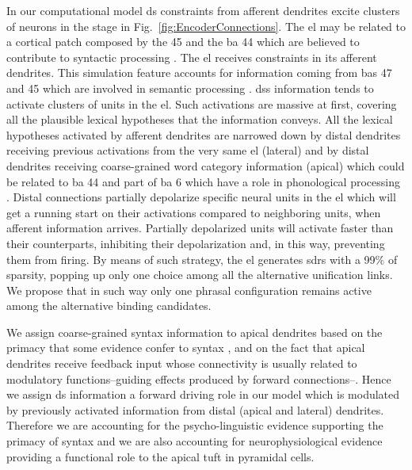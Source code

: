 {In our computational model \gls{ds} constraints from afferent dendrites excite clusters of neurons in the  stage in Fig.~\ref{fig:EncoderConnections}.
The \gls{el} may be related to a cortical patch composed by the  45 and the \gls{ba} 44 which are believed to contribute to syntactic processing \cite{Pallier2522, doi:10.1152/physrev.00006.2011, doi:10.1146/annurev-neuro-071013-013847}. The \gls{el} receives  constraints in its afferent dendrites. This simulation feature accounts for information coming from \glspl{ba} 47 and 45 which are involved in semantic processing \cite{GOUCHA2015294, DECARLI2007933, PMID:15528098, NEWMAN201051}. \glspl{ds} information tends to activate clusters of units in the \gls{el}. Such activations are massive at first, covering all the plausible lexical hypotheses that the  information conveys. All the lexical hypotheses activated by afferent dendrites are narrowed down by distal dendrites receiving previous activations from the very same \gls{el} (lateral) and by distal dendrites receiving coarse-grained word category information (apical)
which could be related to \gls{ba} 44 and part of \gls{ba} 6 which have a role in phonological processing \cite{Lee3942, PMID:27381836, HEIM2003285, PMID:18296070, AMUNTS200442}.
Distal connections partially depolarize specific neural units in the \gls{el} which will get a running start on their activations compared to neighboring units, when afferent information arrives. Partially depolarized units will activate faster than their counterparts, inhibiting their depolarization and, in this way, preventing them from firing. By means of such strategy, the \gls{el} generates \glspl{sdr} with a 99\% of sparsity, popping up only one choice among all the alternative unification links. We propose that in such way only one phrasal configuration remains active among the alternative binding candidates.

We assign coarse-grained syntax information to apical dendrites based on the primacy that some evidence confer to syntax
\cite{BORNKESSELSCHLESEWSKY200855,doi:10.1111/j.1749-818X.2008.00099.x,FRIEDERICI200278,doi:10.1152/physrev.00006.2011}, and on the fact that
apical dendrites receive feedback input \cite{Spruston2008PyramidalND} whose connectivity is usually related to modulatory functions--guiding effects produced by forward connections--\cite{news_hidden_2018, marques_functional_2018, Chen2009ForwardAB}.
Hence we assign \gls{ds} information a forward driving role in our model which is modulated by previously activated information from distal (apical and lateral) dendrites. Therefore we are accounting for the psycho-linguistic evidence supporting the primacy of syntax and we are also accounting for neurophysiological evidence providing a functional role to the apical tuft in pyramidal cells.

}
